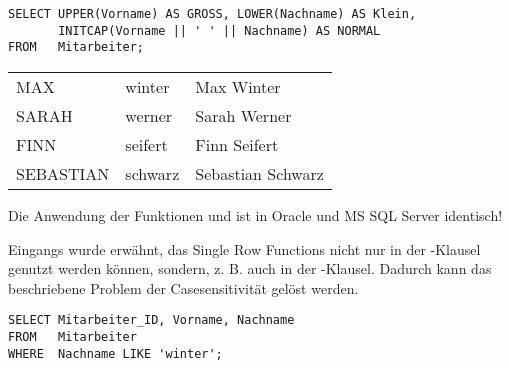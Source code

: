         \begin{lstlisting}[language=oracle_sql,caption={UPPER, LOWER und INITCAP},label=sql03_01]
SELECT UPPER(Vorname) AS GROSS, LOWER(Nachname) AS Klein,
       INITCAP(Vorname || ' ' || Nachname) AS NORMAL
FROM   Mitarbeiter;
        \end{lstlisting}
        \begin{center}
          \begin{small}
            \tablehead{}
            \tabletail {
            }
            \begin{oraclesql}
              \begin{supertabular}{lll}
                MAX & winter & Max Winter \\
                SARAH & werner & Sarah Werner \\
                FINN & seifert & Finn Seifert \\
                SEBASTIAN & schwarz & Sebastian Schwarz \\
              \end{supertabular}
            \end{oraclesql}
          \end{small}
        \end{center}
        \begin{merke}
          Die Anwendung der Funktionen  und  ist in Oracle und MS SQL Server identisch!
        \end{merke}
        Eingangs wurde erwähnt, das Single Row Functions nicht nur in der \SELECT-Klausel genutzt werden können, sondern, z. B. auch in der \WHERE-Klausel. Dadurch kann das beschriebene Problem der Casesensitivität gelöst werden.
        \begin{lstlisting}[language=oracle_sql,caption={Das Problem der Casesensitivität},label=sql03_02]
SELECT Mitarbeiter_ID, Vorname, Nachname
FROM   Mitarbeiter
WHERE  Nachname LIKE 'winter';
        \end{lstlisting}
